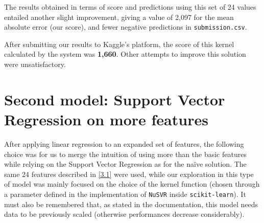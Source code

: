 The results obtained in terms of score and predictions using this set of 24 values entailed another slight improvement, giving a value of 2,097 for the mean absolute error (our score), and fewer negative predictions in \texttt{submission.csv}.

After submitting our results to Kaggle's platform, the score of this kernel calculated by the system was \textbf{1,660}. Other attempts to improve this solution were unsatisfactory.



\section[Second model]{Second model: Support Vector Regression on more features}
After applying linear regression to an expanded set of features, the following choice was for us to merge the intuition of using more than the basic features while relying on the Support Vector Regression as for the na{\"i}ve solution. The same 24 features described in \ref{3.1} were used, while our exploration in this type of model was mainly focused on the choice of the kernel function (chosen through a parameter defined in the implementation of \texttt{NuSVR} inside \texttt{scikit-learn}). It must also be remembered that, as stated in the documentation, this model needs data to be previously scaled (otherwise performances decrease considerably).

